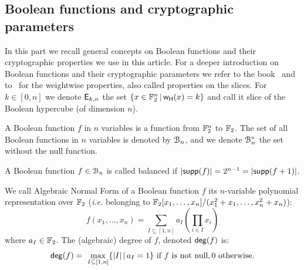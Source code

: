 \documentclass[11pt]{llncs}
\begin{document}


\subsection{Boolean functions and cryptographic parameters}

In this part we recall general concepts on Boolean functions and their cryptographic properties we use in this article. 
For a deeper introduction on Boolean functions and their cryptographic parameters we refer to the book~\cite{Carlet20} and to~\cite{TOSC:CarMeaRot17} for the weightwise properties, also called properties on the slices.
For $k \in [0,n]$ we denote $\mathsf{E}_{k,n}$ the set $\{x\in \mathbb{F}_2^n \, | \, \mathsf{w_H}(x)=k  \}$ and call it slice of the Boolean hypercube (of dimension $n$). 


\begin{definition}\label{def:bool_f}
	A Boolean function $f$ in $n$ variables is a function from $\mathbb{F}_2^n$ to $\mathbb{F}_2$. 
	The set of all Boolean functions in $n$ variables is denoted by $\mathcal{B}_n$, and we denote $\mathcal{B}_n^*$ the set without the null function.
\end{definition}


\begin{definition}[Balancedness]\label{def:balancedness}
	A Boolean function $f\in \mathcal{B}_n$ is called balanced if $|\mathsf{supp}(f)|=2^{n-1}=|\mathsf{supp}(f+1)|$. 
	
\end{definition}

\begin{definition}\label{def:anf}
	We call Algebraic Normal Form of a Boolean function $f$ its $n$-variable polynomial representation over $\mathbb{F}_2$ (\textit{i.e.} belonging to $\mathbb{F}_2[x_1,\dots,x_n]/(x_1^2+x_1,\dots,x_n^2+x_n)$):
	\[f(x_1,\dots,x_n)= \sum_{I \subseteq [1,n]} a_I \left( \prod_{i \in I} x_i \right) \]%
	where $a_I\in \mathbb{F}_2$. 	
	The (algebraic) degree of $f$, denoted $\mathsf{deg}(f)$ is: \[\mathsf{deg}(f)=\
	\max_{I\subseteq [1,n]}\{ |I|\, | \, a_I=1\}  \text{ if $f$ is not null},0  \text{ otherwise}.\]
\end{definition}
\end{document}
